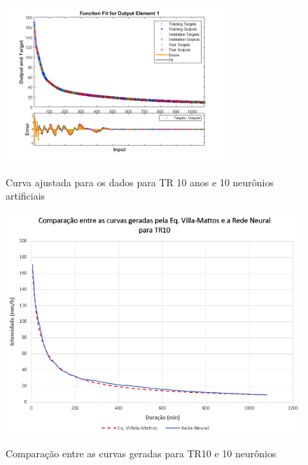\begin{figure}[H]
    \caption{Curva ajustada para os dados para TR 10 anos e 10 neurônios artificiais}
    \centering
    \includegraphics[width=0.74\textwidth]{Textuais/Figuras/NN/tr10-10neuronio.png}
    \label{fig:tr10-10n}
\end{figure}

\begin{figure}[H]
    \caption{Comparação entre as curvas geradas para TR10 e 10 neurônios}
    \centering
    \includegraphics[width=\textwidth]{Textuais/Resultados/Comparacao/TR10.png}
    \label{fig:comp-tr10}
\end{figure}